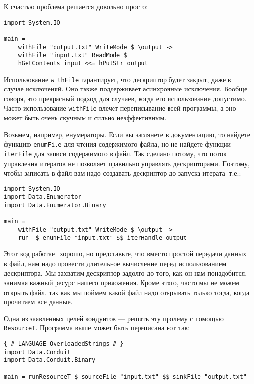 К счастью проблема решается довольно просто:
\begin{lstlisting}
import System.IO

main =
    withFile "output.txt" WriteMode $ \output ->
    withFile "input.txt" ReadMode $ 
    hGetContents input <<= hPutStr output
\end{lstlisting}

Использование \lstinline'withFile' гарантирует, что дескриптор будет закрыт, даже в
случае
исключений. Оно также поддерживает асинхронные исключения. Вообще говоря, это прекрасный
подход для случаев, когда его использование допустимо. Часто использование \lstinline'withFile' влечет переписывание всей программы, а оно может быть очень
скучным и сильно неэффективным.

Возьмем, например, енумераторы. Если вы заглянете в документацию, то найдете функцию
\lstinline'enumFile' для чтения содержимого файла, но не найдете функции
\lstinline'iterFile' для записи
содержимого в файл. Так сделано потому, что поток управления итератов не позволяет
правильно управлять дескрипторами. Поэтому, чтобы записать в файл вам надо создавать
дескриптор до запуска итерата, т.е.: 

\begin{lstlisting}
import System.IO
import Data.Enumerator
import Data.Enumerator.Binary

main =
    withFile "output.txt" WriteMode $ \output ->
    run_ $ enumFile "input.txt" $$ iterHandle output
\end{lstlisting}

Этот код работает хорошо, но представьте, что вместо простой передачи данных в файл, нам
надо провести длительное вычисление перед использованием дескриптора. Мы захватим
дескриптор задолго до того, как он нам понадобится, занимая важный ресурс нашего
приложения. Кроме этого, часто мы не можем открыть файл, так как мы поймем какой файл
надо открывать только тогда, когда прочитаем все данные.

Одна из заявленных целей кондуитов --- решить эту пролему с помощью \lstinline'ResourceT'.
Программа выше может быть переписана вот так:
\begin{lstlisting}
{-# LANGUAGE OverloadedStrings #-}
import Data.Conduit
import Data.Conduit.Binary

main = runResourceT $ sourceFile "input.txt" $$ sinkFile "output.txt"
\end{lstlisting}

